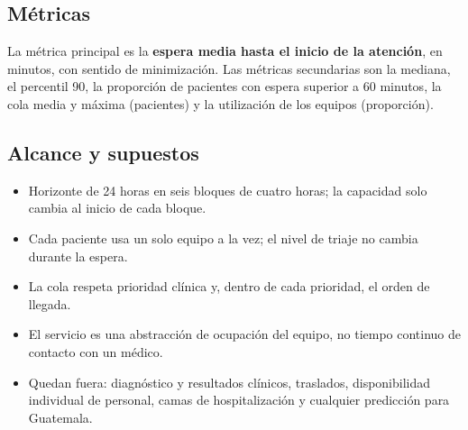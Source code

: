 \subsection{Métricas}
La métrica principal es la \textbf{espera media hasta el inicio de la atención}, en
minutos, con sentido de minimización. Las métricas secundarias son la mediana, el
percentil 90, la proporción de pacientes con espera superior a 60 minutos, la cola media y
máxima (pacientes) y la utilización de los equipos (proporción).

\subsection{Alcance y supuestos}
\begin{itemize}
  \item Horizonte de 24 horas en seis bloques de cuatro horas; la capacidad solo cambia al
  inicio de cada bloque.
  \item Cada paciente usa un solo equipo a la vez; el nivel de triaje no cambia durante la
  espera.
  \item La cola respeta prioridad clínica y, dentro de cada prioridad, el orden de llegada.
  \item El servicio es una abstracción de ocupación del equipo, no tiempo continuo de
  contacto con un médico.
  \item Quedan fuera: diagnóstico y resultados clínicos, traslados, disponibilidad
  individual de personal, camas de hospitalización y cualquier predicción para Guatemala.
\end{itemize}
